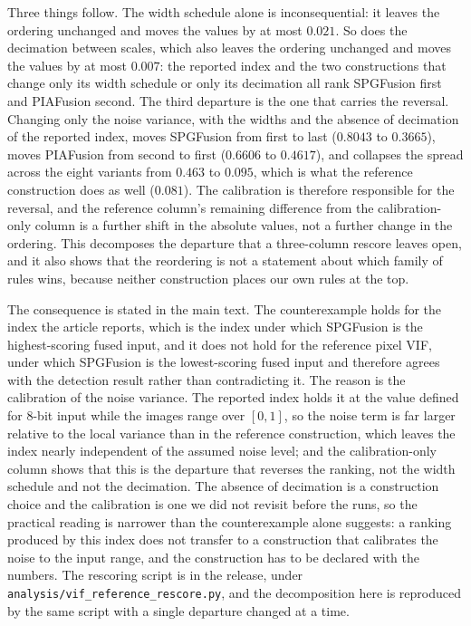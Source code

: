 \documentclass[11pt,a4paper]{article}
\begin{document}
Three things follow. The width schedule alone is inconsequential: it leaves the
ordering unchanged and moves the values by at most $0.021$. So does the decimation
between scales, which also leaves the ordering unchanged and moves the values by at
most $0.007$: the reported index and the two constructions that change only its width
schedule or only its decimation all rank SPGFusion first and PIAFusion second. The
third departure is the one that carries the reversal. Changing only the noise
variance, with the widths and the absence of decimation of the reported index, moves
SPGFusion from first to last ($0.8043$ to $0.3665$), moves PIAFusion from second to
first ($0.6606$ to $0.4617$), and collapses the spread across the eight variants from
$0.463$ to $0.095$, which is what the reference construction does as well ($0.081$).
The calibration is therefore responsible for the reversal, and the reference column's
remaining difference from the calibration-only column is a further shift in the
absolute values, not a further change in the ordering. This decomposes the departure
that a three-column rescore leaves open, and it also shows that the reordering is not
a statement about which family of rules wins, because neither construction places our
own rules at the top.

The consequence is stated in the main text. The counterexample holds for the index
the article reports, which is the index under which SPGFusion is the highest-scoring
fused input, and it does not hold for the reference pixel VIF, under which SPGFusion
is the lowest-scoring fused input and therefore agrees with the detection result
rather than contradicting it. The reason is the calibration of the noise variance. The
reported index holds it at the value defined for 8-bit input while the images range
over $[0,1]$, so the noise term is far larger relative to the local variance than in
the reference construction, which leaves the index nearly independent of the assumed
noise level; and the calibration-only column shows that this is the departure that
reverses the ranking, not the width schedule and not the decimation. The absence of
decimation is a construction choice and the calibration is one we did not revisit
before the runs, so the practical reading is narrower than the counterexample alone
suggests: a ranking produced by this index does not transfer to a construction that
calibrates the noise to the input range, and the construction has to be declared with
the numbers. The rescoring script is in the release, under
\texttt{analysis/vif\_reference\_rescore.py}, and the decomposition here is reproduced
by the same script with a single departure changed at a time.
\end{document}
